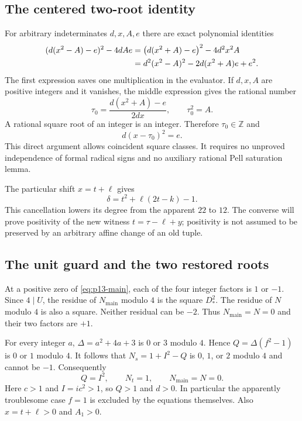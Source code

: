 \subsection{The centered two-root identity}

For arbitrary indeterminates $d,x,A,e$ there are exact polynomial identities
\begin{align}
 (d(x^2-A)-e)^2-4dAe
 &=\bigl(d(x^2+A)-e\bigr)^2-4d^2x^2A \notag\\
 &=d^2(x^2-A)^2-2d(x^2+A)e+e^2.
 \label{eq:p13-norm-identity}
\end{align}
The first expression saves one multiplication in the evaluator. If
$d,x,A$ are positive integers and it vanishes, the middle expression gives
the rational number
\[
 \tau_0=\frac{d(x^2+A)-e}{2dx},\qquad \tau_0^2=A.
\]
A rational square root of an integer is an integer. Therefore
$\tau_0\in\mathbb Z$ and
\begin{equation}
 d(x-\tau_0)^2=e.
 \label{eq:p13-second-root}
\end{equation}
This direct argument allows coincident square classes. It requires no
unproved independence of formal radical signs and no auxiliary rational
Pell saturation lemma.

The particular shift $x=t+\ell$ gives
\begin{equation}
 \delta=t^2+\ell(2t-k)-1.
 \label{eq:p13-centering}
\end{equation}
This cancellation lowers its degree from the apparent $22$ to $12$.
The converse will prove positivity of the new witness
$t=\tau-\ell+y$; positivity is not assumed to be preserved by an arbitrary
affine change of an old tuple.

\subsection{The unit guard and the two restored roots}

At a positive zero of \eqref{eq:p13-main}, each of the four integer factors
is $1$ or $-1$. Since $4\mid U$, the residue of $N_{\mathrm{main}}$ modulo
$4$ is the square $D_*^2$. The residue of $N$ modulo $4$ is also a square.
Neither residual can be $-2$. Thus
$N_{\mathrm{main}}=N=0$ and their two factors are $+1$.

For every integer $a$, $\Delta=a^2+4a+3$ is $0$ or $3$ modulo $4$.
Hence $Q=\Delta(f^2-1)$ is $0$ or $1$ modulo $4$.
It follows that $N_s=1+I^2-Q$ is $0$, $1$, or $2$ modulo $4$ and cannot
be $-1$. Consequently
\begin{equation}
 Q=I^2,\qquad N_t=1,\qquad N_{\mathrm{main}}=N=0.
 \label{eq:p13-guard-conclusions}
\end{equation}
Here $c>1$ and $I=ic^2>1$, so $Q>1$ and $d>0$. In particular the
apparently troublesome case $f=1$ is excluded by the equations themselves.
Also $x=t+\ell>0$ and $A_1>0$.

